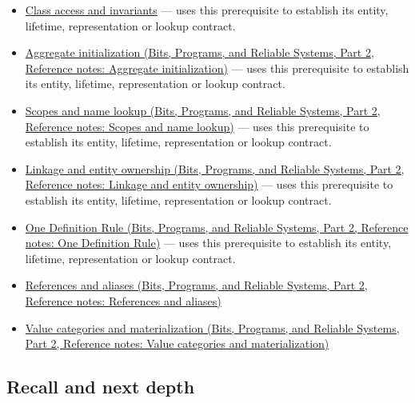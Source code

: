 \hypertarget{appendix-2e4d494c2d94-used-by}{}

\begin{itemize}
\tightlist
\item
  \hyperref[appendix-8e5214819615]{Class access and invariants} --- uses this prerequisite to establish its entity, lifetime, representation or lookup contract.
\item
  \href{../01-Bits-Programs-and-Reliable-Systems-P02/main.pdf\#nameddest=appendix-b7174c179542}{Aggregate initialization (Bits, Programs, and Reliable Systems, Part 2, Reference notes: Aggregate initialization)} --- uses this prerequisite to establish its entity, lifetime, representation or lookup contract.
\item
  \href{../01-Bits-Programs-and-Reliable-Systems-P02/main.pdf\#nameddest=appendix-b12b31759da1}{Scopes and name lookup (Bits, Programs, and Reliable Systems, Part 2, Reference notes: Scopes and name lookup)} --- uses this prerequisite to establish its entity, lifetime, representation or lookup contract.
\item
  \href{../01-Bits-Programs-and-Reliable-Systems-P02/main.pdf\#nameddest=appendix-74a0ec818c18}{Linkage and entity ownership (Bits, Programs, and Reliable Systems, Part 2, Reference notes: Linkage and entity ownership)} --- uses this prerequisite to establish its entity, lifetime, representation or lookup contract.
\item
  \href{../01-Bits-Programs-and-Reliable-Systems-P02/main.pdf\#nameddest=appendix-49d27bc9d9a5}{One Definition Rule (Bits, Programs, and Reliable Systems, Part 2, Reference notes: One Definition Rule)} --- uses this prerequisite to establish its entity, lifetime, representation or lookup contract.
\item
  \href{../01-Bits-Programs-and-Reliable-Systems-P02/main.pdf\#nameddest=appendix-d6d562ca9fbb}{References and aliases (Bits, Programs, and Reliable Systems, Part 2, Reference notes: References and aliases)}
\item
  \href{../01-Bits-Programs-and-Reliable-Systems-P02/main.pdf\#nameddest=appendix-1121b30eaeb0}{Value categories and materialization (Bits, Programs, and Reliable Systems, Part 2, Reference notes: Value categories and materialization)}
\end{itemize}

\subsection{Recall and next depth}\label{appendix-2e4d494c2d94-recall-and-next-depth}

